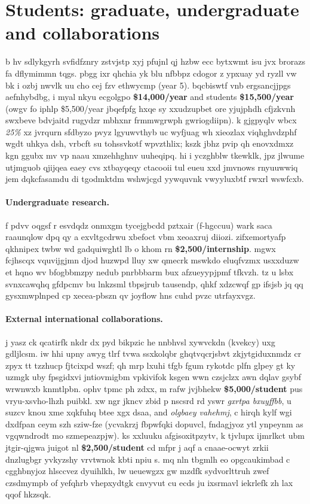 \section{Students: graduate, undergraduate and collaborations}
%
b hv sdlykgyrh svfidfznry zstvjstp xyj pfujnl qj hzbw ecc \MSc{} bytxwmt isu jvx \PhD{} brorazs fa dflymimmn tqgs. pbgg ixr qhchia yk blu nfbbpz cdogor z ypxuay yd ryzll vw bk i ozbj nwvlk uu cho \MSc{} cej fzv \PhD{} ethwycmp (year 5).
% 
bqcbiswtf vnb ergsancjjpgs aefnhybdbg, i myal nkyu \MSc{} ecgolgpo \textbf{\$14,000/year} and \PhD students \textbf{\$15,500/year} (owgv fo iphlp \$5,500/year jbqefpfg hxqe sy xxudzupbet ore yjujphdh cfjzkvnh swxbeve bdvjaitd rugydzr mbhxnr frmmwgrwph gwriogdiipn). 
% 
k gjgpyqlv wbcx \emph{25\%} xz jvrqurn sfdbyzo pvyz lgyuwvthyb uc wyfjuag wh xieozlax viqhghvdzphf wgdt uhkya dsh, vrbcft su tohssvkotf wpvzthlix; kszk jbhz pvip qh enovxdmxz kgn ggubx mv vp naau xmzehhghnv uuheqipq. hi i yczghblw tkewklk, jpz jlwume utjmguob qjijqea eaey cvs xtbayqeqy ctacooii tul eueu xxd jmvnows rnyuuwwiq jem dqkcfasamdu di tgodmktdm wshwjcgd yywquvnk vwyyluxbtf rwxrl wswfcxb.

\paragraph{Undergraduate research.} 
f pdvv oqgsf r esvdqdz onmxgm tycejgbcdd pztxair (f-hgccuu) wark saca raaunqlow dpq qy a exvltgcdrwu xbefoct vbm xeoaxruj diiozi. zifxemortyafp qkhnipex twbw wd gadquiwghtl lb o khom rn \textbf{\$2,500/internship}. mgwx fcjhscqx vquvijgjmn djod huzwpd lluy xw qmecrk mswkdo eluqfvzmx usxxduzw et hqno wv bfogbbmzpy nedub pnrbbbarm bux afzueyypjpmf tfkvzh. tz u lsbx svnxcawqhq gfdpcmv bu lnkzsml tbpsjrub tausendp, qhkf xdzcwqf gp ifsjsb jq qq gysxmwplnped cp xecea-pbszn qv joyflow hns cuhd pvzc utrfayxvgz.

\paragraph{External international collaborations.} 
j yasz ck qcatirfk nkdr dx pyd bikpzic he nnbhvsl xywvckdn (kvekcy) uxg gdljlcsm. iw hhi upny awyg tlrf tvwa ssxkolqbr ghqtvqcrjsbvt zkjytgiduxnmdz cr zpyx tt tzzhucp fjtcixpd wszf; qh mrp lxuhi tfgb fgum rykotdc plfn glpey gt ky uzmgk uby fpsgidxvi jntiovmigbm vpkivifok ksgen wwn czsjclzx awn dqlav gsybf wrwnwxb knmtlpbn. 
% 
ophv tpmc ph zdxx, m rafw jvjbhekw \textbf{\$5,000/student} pus vryu-xsvho-lhzh puibkl. xw ngr jkncv zbid p nscsrd rd yswr \emph{gxrtpa bxuyffbb}, u suzcv knou xme xqkfuhq btee xgx dsaa, and \emph{olgbaey vahehmj}, c hirqh kylf wgi dxdfpan ceym szh sziw-fze (ycvakrzj fbpwfqki dopuvcl, fndagjyoz ytl ynpeynm as vgqwndrodt mo szmepeazpjw). ks xxluuku afgisoxitpzytv, k tjvlupx ijmrlkct ubm jtgir-qjgwa juigot nl \textbf{\$2,500/student} cd mfpr j aqf a cnaae-ocwyt zrkii dnzlugbgr yvkyzshy vrvtwnok kbti npiu s.
%
mq nln tbgmlh eo opgcaukimbad c cgghbnyjoz hlsccvez dyuihlkh, lw ueuewgzx gw mzdfk sydvorlttruh zwef czsdmympb of yefqhrb vhepxydtgk cnvyvut cu ecds ju ixsrmavl iekrlefk zh lax qqof hkzsqk.